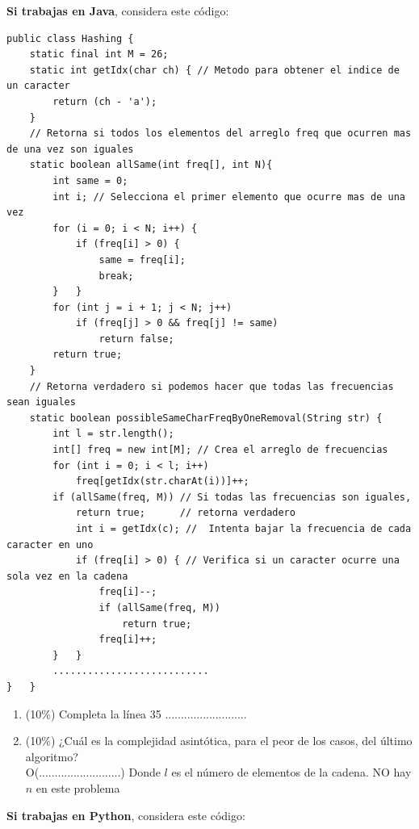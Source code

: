 \documentclass[10 pt]{article}
\begin{document}
\textbf{Si trabajas en Java}, considera este código:

{\small
\begin{lstlisting}
public class Hashing {
    static final int M = 26;
    static int getIdx(char ch) { // Metodo para obtener el indice de un caracter 
        return (ch - 'a');
    }
    // Retorna si todos los elementos del arreglo freq que ocurren mas de una vez son iguales
    static boolean allSame(int freq[], int N){
        int same = 0;
        int i; // Selecciona el primer elemento que ocurre mas de una vez
        for (i = 0; i < N; i++) {
            if (freq[i] > 0) {
                same = freq[i];
                break;
        }   }
        for (int j = i + 1; j < N; j++)
            if (freq[j] > 0 && freq[j] != same)
                return false;
        return true;
    }
    // Retorna verdadero si podemos hacer que todas las frecuencias sean iguales
    static boolean possibleSameCharFreqByOneRemoval(String str) {
        int l = str.length();        
        int[] freq = new int[M]; // Crea el arreglo de frecuencias 
        for (int i = 0; i < l; i++)
            freq[getIdx(str.charAt(i))]++;        
        if (allSame(freq, M)) // Si todas las frecuencias son iguales, 
            return true;      // retorna verdadero        
            int i = getIdx(c); //  Intenta bajar la frecuencia de cada caracter en uno             
            if (freq[i] > 0) { // Verifica si un caracter ocurre una sola vez en la cadena
                freq[i]--;
                if (allSame(freq, M))
                    return true;
                freq[i]++;
        }   }
        ...........................
}   }
\end{lstlisting}
}

\begin{enumerate}[label=(\Alph*)]
  \item (10\%) Completa la línea 35 ..........................
  \item (10\%) ¿Cuál es la complejidad asintótica, para el peor de los casos, del último algoritmo? \\
  O(..........................) Donde $l$ es el número de elementos de la cadena. NO hay $n$ en este problema
\end{enumerate}

\newpage

\textbf{Si trabajas en Python}, considera este código:
\end{document}

